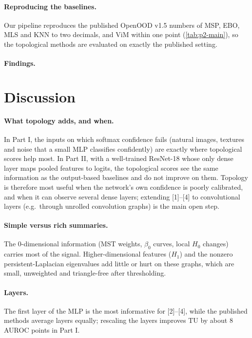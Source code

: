 \documentclass[11pt]{article}
\begin{document}
\paragraph{Reproducing the baselines.} Our pipeline reproduces the published OpenOOD v1.5 numbers of
MSP, EBO, MLS and KNN to two decimals, and ViM within one point (\cref{tab:p2-main}), so the
topological methods are evaluated on exactly the published setting.




\paragraph{Findings.}


\section{Discussion}
\label{sec:discussion}
\paragraph{What topology adds, and when.} In Part I, the inputs on which softmax confidence fails
(natural images, textures and noise that a small MLP classifies confidently) are exactly where
topological scores help most. In Part II, with a well-trained ResNet-18 whose only dense layer maps
pooled features to logits, the topological scores see the same information as the output-based
baselines and do not improve on them. Topology is therefore most useful when the network's own
confidence is poorly calibrated, and when it can observe several dense layers; extending [1]--[4]
to convolutional layers (e.g.\ through unrolled convolution graphs) is the main open step.
\paragraph{Simple versus rich summaries.} The 0-dimensional information (MST weights, $\beta_0$
curves, local $H_0$ changes) carries most of the signal. Higher-dimensional features ($H_1$) and
the nonzero persistent-Laplacian eigenvalues add little or hurt on these graphs, which are small,
unweighted and triangle-free after thresholding.
\paragraph{Layers.} The first layer of the MLP is the most informative for [2]--[4], while the
published methods average layers equally; rescaling the layers improves TU by about 8 AUROC
points in Part I.
\end{document}
